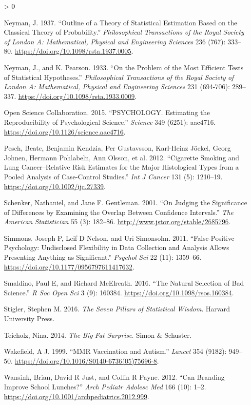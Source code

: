 \documentclass[
  12pt,
]{book}
\newlength{\cslhangindent}
\newenvironment{CSLReferences}[2] %
 {%
  \setlength{\parindent}{0pt}
  \ifodd #1 \everypar{\setlength{\hangindent}{\cslhangindent}}\ignorespaces\fi
  \ifnum #2 > 0
  \setlength{\parskip}{#2\baselineskip}
  \fi
 }%
 {}
\begin{document}
\begin{CSLReferences}{1}{0}
\leavevmode\hypertarget{ref-Neyman37}{}%
Neyman, J. 1937. {``Outline of a Theory of Statistical Estimation Based on the Classical Theory of Probability.''} \emph{Philosophical Transactions of the Royal Society of London A: Mathematical, Physical and Engineering Sciences} 236 (767): 333--80. \url{https://doi.org/10.1098/rsta.1937.0005}.

\leavevmode\hypertarget{ref-Neyman289}{}%
Neyman, J., and K. Pearson. 1933. {``On the Problem of the Most Efficient Tests of Statistical Hypotheses.''} \emph{Philosophical Transactions of the Royal Society of London A: Mathematical, Physical and Engineering Sciences} 231 (694-706): 289--337. \url{https://doi.org/10.1098/rsta.1933.0009}.

\leavevmode\hypertarget{ref-open:2015}{}%
Open Science Collaboration. 2015. {``PSYCHOLOGY. Estimating the Reproducibility of Psychological Science.''} \emph{Science} 349 (6251): aac4716. \url{https://doi.org/10.1126/science.aac4716}.

\leavevmode\hypertarget{ref-pesc:kend:gust:2012}{}%
Pesch, Beate, Benjamin Kendzia, Per Gustavsson, Karl-Heinz Jöckel, Georg Johnen, Hermann Pohlabeln, Ann Olsson, et al. 2012. {``Cigarette Smoking and Lung Cancer--Relative Risk Estimates for the Major Histological Types from a Pooled Analysis of Case-Control Studies.''} \emph{Int J Cancer} 131 (5): 1210--19. \url{https://doi.org/10.1002/ijc.27339}.

\leavevmode\hypertarget{ref-sche:gent:2001}{}%
Schenker, Nathaniel, and Jane F. Gentleman. 2001. {``On Judging the Significance of Differences by Examining the Overlap Between Confidence Intervals.''} \emph{The American Statistician} 55 (3): 182--86. \url{http://www.jstor.org/stable/2685796}.

\leavevmode\hypertarget{ref-simm:nels:simo:2011}{}%
Simmons, Joseph P, Leif D Nelson, and Uri Simonsohn. 2011. {``False-Positive Psychology: Undisclosed Flexibility in Data Collection and Analysis Allows Presenting Anything as Significant.''} \emph{Psychol Sci} 22 (11): 1359--66. \url{https://doi.org/10.1177/0956797611417632}.

\leavevmode\hypertarget{ref-smal:mcel:2016}{}%
Smaldino, Paul E, and Richard McElreath. 2016. {``The Natural Selection of Bad Science.''} \emph{R Soc Open Sci} 3 (9): 160384. \url{https://doi.org/10.1098/rsos.160384}.

\leavevmode\hypertarget{ref-stig}{}%
Stigler, Stephen M. 2016. \emph{The Seven Pillars of Statistical Wisdom}. Harvard University Press.

\leavevmode\hypertarget{ref-teic:2014}{}%
Teicholz, Nina. 2014. \emph{The Big Fat Surprise}. Simon \& Schuster.

\leavevmode\hypertarget{ref-wake:1999}{}%
Wakefield, A J. 1999. {``MMR Vaccination and Autism.''} \emph{Lancet} 354 (9182): 949--50. \url{https://doi.org/10.1016/S0140-6736(05)75696-8}.

\leavevmode\hypertarget{ref-wans:just:payn:2012}{}%
Wansink, Brian, David R Just, and Collin R Payne. 2012. {``Can Branding Improve School Lunches?''} \emph{Arch Pediatr Adolesc Med} 166 (10): 1--2. \url{https://doi.org/10.1001/archpediatrics.2012.999}.

\end{CSLReferences}
\end{document}
